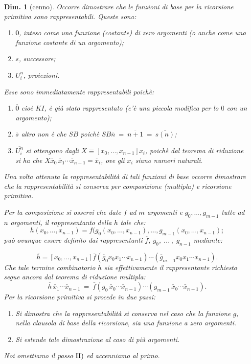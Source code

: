 \documentclass{book}
\newtheorem{dimostrazione}{Dim.}[chapter]
\begin{document}
\begin{dimostrazione}[cenno]
Occorre dimostrare che le funzioni di base per la ricorsione primitiva sono
 rappresentabili. Queste sono:
\begin{enumerate}
\item[-]$0$, inteso come una funzione (costante) di zero argomenti (o anche 
  come  una funzione costante di un argomento);
\item[-]$s$, successore;
\item[-]$U_i^n$, proiezioni.
\end{enumerate}
Esse sono immediatamente rappresentabili poich\`e:
\begin{enumerate}
\item[-]$\overline{0}$ cio\`e $KI$, \`e gi\`a stato rappresentato (c'\`e una 
  piccola modifica per lo $0$ con un argomento);
\item[-]$\overline{s}$ altro non \`e che $S\!B$ poich\`e $S\!B\overline{n}\ = 
\ \overline{n+1}\ =\ \overline{s(n)}$;
\item[-]$\overline{U_i^n}$ si ottengono dagli $X \equiv [x_0, \ldots , x_{n-1}]
  x_i$, poich\`e dal teorema di riduzione si ha che $X\overline{x}_0\,
  \overline{x}_1 \cdots \overline{x}_{n-1} = \overline{x}_i$, ove gli $x_i$
  siano numeri naturali.
\end{enumerate}
Una volta ottenuta la rappresentabilit\`a  di tali funzioni di base occorre 
dimostrare che la rappresentabilit\`a si conserva per composizione (multipla) 
e ricorsione primitiva.

Per la composizione si osservi che date $f$ ad $m$ argomenti e $g_0, \ldots , 
g_{m-1}$ tutte ad $n$ argomenti, il rappresentanto della $h$ tale che:
\[
h(x_0, \ldots , x_{n-1}) = f(g_0(x_0, \ldots , x_{n-1}), \ldots ,  g_{m-1}(x_0,
 \ldots , x_{n-1});
\]
pu\`o ovunque essere definito dai rappresentanti $\overline{f}$, 
$\overline{g}_0$, $\ldots$ , $\overline{g}_{n-1}$ mediante:

\[
\overline{h} = [x_0, \ldots , x_{n-1}] \overline{f}(\overline{g}_0x_0
x_{1}\cdots x_{n-1})\cdots (\overline{g}_{m-1}x_0x_{1}\cdots x_{n-1}).
\]
Che tale termine combinatorio $\overline{h}$ sia effettivamente il 
rappresentante richiesto segue ancora dal teorema di riduzione multipla:
\[
\overline{h}\,\overline{x}_1\cdots\overline{x}_{n-1} \ = \ \overline{f}(
\overline{g}_0\,\overline{x}_0 \cdots \overline{x}_{n-1})\cdots(
\overline{g}_{m-1}\,\overline{x}_0\cdots\overline{x}_{n-1}).
\]
Per la ricorsione primitiva si procede in due passi:
\begin{enumerate}
\item[\rm{I)}]Si dimostra che la rappresentabilit\`a si conserva nel caso che 
  la funzione $g$, nella clausola di base della ricorsione, sia una funzione a 
  zero argomenti.
\item[\rm{II)}]Si estende tale dimostrazione al caso di pi\`u argomenti.
\end{enumerate}
Noi omettiamo il passo $\rm{II)}$  ed accenniamo al primo.


\end{dimostrazione}
\end{document}
